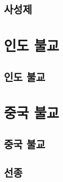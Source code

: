 \documentclass[12pt, a4paper, oneside]{book}
\let\stdsection\section
\renewcommand\section{\newpage\stdsection}
\begin{document}
	\newpage	
	\minitoc


%
	\section{ 사성제 }




	\chapter{ 인도 불교 }
	\noptcrule

	\newpage	
	\minitoc


%
	\section{ 인도 불교 }






	\chapter{ 중국 불교 }
	\noptcrule

	\newpage	
	\minitoc


%
	\section{ 중국 불교 }


%
	\section{ 선종 }
\end{document}
